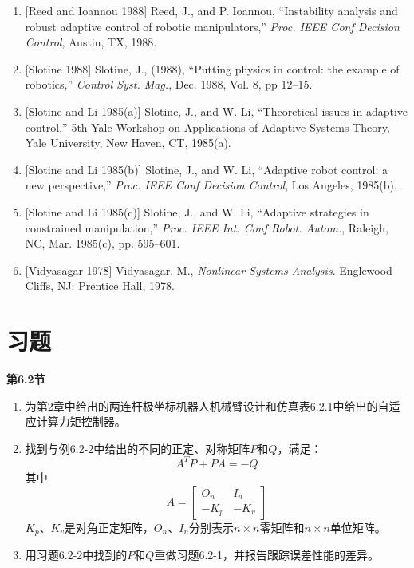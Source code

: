 \documentclass[12pt,a4paper]{ctexart}
\begin{document}
\begin{enumerate}
\item {[Reed and Ioannou 1988]} Reed, J., and P. Ioannou, ``Instability analysis and robust adaptive control of robotic manipulators,'' \textit{Proc. IEEE Conf Decision Control}, Austin, TX, 1988.

\item {[Slotine 1988]} Slotine, J., (1988), ``Putting physics in control: the example of robotics,'' \textit{Control Syst. Mag.}, Dec. 1988, Vol. 8, pp 12--15.

\item {[Slotine and Li 1985(a)]} Slotine, J., and W. Li, ``Theoretical issues in adaptive control,'' 5th Yale Workshop on Applications of Adaptive Systems Theory, Yale University, New Haven, CT, 1985(a).

\item {[Slotine and Li 1985(b)]} Slotine, J., and W. Li, ``Adaptive robot control: a new perspective,'' \textit{Proc. IEEE Conf Decision Control}, Los Angeles, 1985(b).

\item {[Slotine and Li 1985(c)]} Slotine, J., and W. Li, ``Adaptive strategies in constrained manipulation,'' \textit{Proc. IEEE Int. Conf Robot. Autom.}, Raleigh, NC, Mar. 1985(c), pp. 595--601.

\item {[Vidyasagar 1978]} Vidyasagar, M., \textit{Nonlinear Systems Analysis}. Englewood Cliffs, NJ: Prentice Hall, 1978.
\end{enumerate}

\section*{习题}

\textbf{第6.2节}

\begin{enumerate}
\item[6.2-1] 为第2章中给出的两连杆极坐标机器人机械臂设计和仿真表6.2.1中给出的自适应计算力矩控制器。

\item[6.2-2] 找到与例6.2-2中给出的不同的正定、对称矩阵$P$和$Q$，满足：
\[
A^T P + PA = -Q
\]
其中
\[
A = \begin{bmatrix} O_n & I_n \\ -K_p & -K_v \end{bmatrix}
\]
$K_p$、$K_v$是对角正定矩阵，$O_n$、$I_n$分别表示$n \times n$零矩阵和$n \times n$单位矩阵。

\item[6.2-3] 用习题6.2-2中找到的$P$和$Q$重做习题6.2-1，并报告跟踪误差性能的差异。
\end{enumerate}
\end{document}
